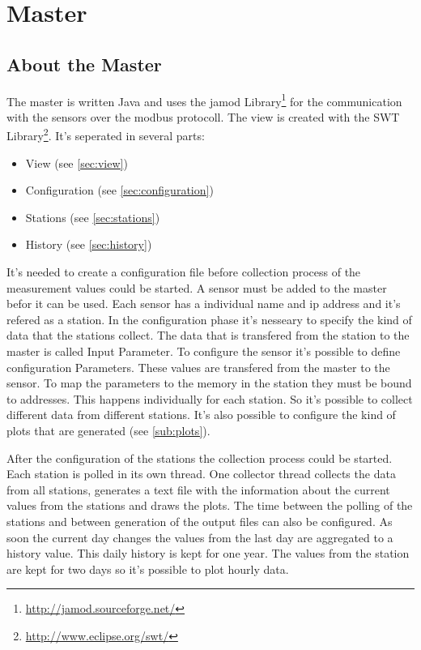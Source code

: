 
\chapter{Master}

\section{About the Master} %
\label{sec:about_the_master}

The master is written Java and uses the jamod Library\footnote{\url{http://jamod.sourceforge.net/}} for the communication with the sensors over the modbus protocoll. The view is created with the SWT Library\footnote{\url{http://www.eclipse.org/swt/}}. 
It's seperated in several parts:
\begin{itemize}
	\item View (see \ref{sec:view})
	\item Configuration (see \ref{sec:configuration})
	\item Stations  (see \ref{sec:stations})
	\item History (see \ref{sec:history})
\end{itemize}

It's needed to create a configuration file before collection process of the measurement values could be started. A sensor must be added to the master befor it can be used. Each sensor has a individual name and ip address and it's refered as a station. In the configuration phase it's nesseary to specify the kind of data that the stations collect. The data that is transfered from the station to the master is called Input Parameter. To configure the sensor it's possible to define configuration Parameters. These values are transfered from the master to the sensor. To map the parameters to the memory in the station they must be bound to addresses. This happens individually for each station. So it's possible to collect different data from different stations. It's also possible to configure the kind of plots that are generated (see \ref{sub:plots}).

After the configuration of the stations the collection process could be started. Each station is polled in its own thread. One collector thread collects the data from all stations, generates a text file with the information about the current values from the stations and draws the plots. The time between the polling of the stations and between generation of the output files can also be configured. As soon the current day changes the values from the last day are aggregated to a history value. This daily history is kept for one year. The values from the station are kept for two days so it's possible to plot hourly data. 

